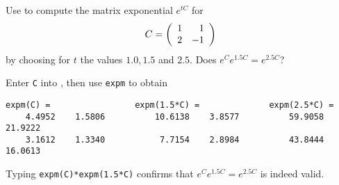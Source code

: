 \documentclass{ximera}
\begin{document}
\begin{exercise} \label{c6.2.2}
Use \Matlab to compute the matrix exponential $e^{tC}$ for
\[
     C =\left(\begin{array}{rr} 1 & 1\\ 2 &-1\end{array}\right)
\]
by choosing for $t$ the values $1.0,1.5$ and $2.5$.  Does $e^{C}
e^{1.5C}=e^{2.5C}$?

\begin{solution}

Enter {\tt C} into \Matlab, then use {\tt expm} to obtain
\begin{verbatim}
expm(C) =                 expm(1.5*C) =              expm(2.5*C) =
    4.4952    1.5806          10.6138    3.8577          59.9058   21.9222
    3.1612    1.3340           7.7154    2.8984          43.8444   16.0613
\end{verbatim}
Typing {\tt expm(C)*expm(1.5*C)} confirms that $e^Ce^{1.5C} =
e^{2.5C}$ is indeed valid.

\end{solution}
\end{exercise}
\end{document}
